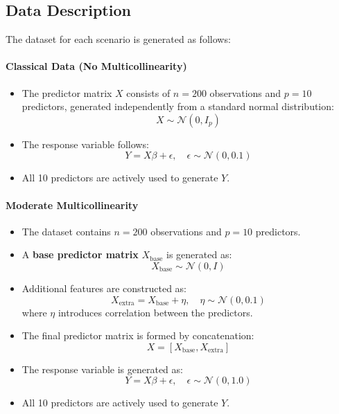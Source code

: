 \documentclass[11pt,twoside,a4paper]{article}
\begin{document}
\subsection{Data Description}
The dataset for each scenario is generated as follows:

\paragraph{Classical Data (No Multicollinearity)}
\begin{itemize}
    \item The predictor matrix \( X \) consists of \( n = 200 \) observations and \( p = 10 \) predictors, generated independently from a standard normal distribution:
    \[ X \sim \mathcal{N}(0, I_p) \]
    \item The response variable follows:
    \[ Y = X \beta + \epsilon, \quad \epsilon \sim \mathcal{N}(0, 0.1) \]
    \item All 10 predictors are actively used to generate \( Y \).
\end{itemize}

\paragraph{Moderate Multicollinearity}
\begin{itemize}
    \item The dataset contains \( n = 200 \) observations and \( p = 10 \) predictors.
    \item A \textbf{base predictor matrix} \( X_{\text{base}} \) is generated as:
    \[ X_{\text{base}} \sim \mathcal{N}(0, I) \]
    \item Additional features are constructed as:
    \[ X_{\text{extra}} = X_{\text{base}} + \eta, \quad \eta \sim \mathcal{N}(0, 0.1) \]
    where \( \eta \) introduces correlation between the predictors.
    \item The final predictor matrix is formed by concatenation:
    \[ X = [X_{\text{base}}, X_{\text{extra}}] \]
    \item The response variable is generated as:
    \[ Y = X \beta + \epsilon, \quad \epsilon \sim \mathcal{N}(0, 1.0) \]
    \item All 10 predictors are actively used to generate \( Y \).
\end{itemize}
\end{document}
